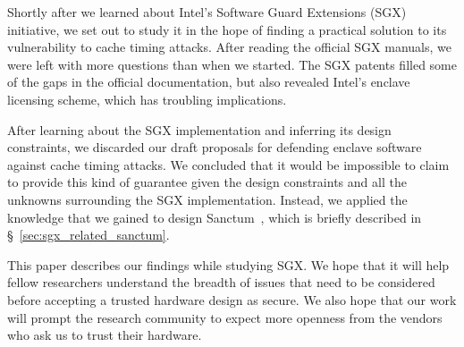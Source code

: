 
Shortly after we learned about Intel's Software Guard Extensions
(SGX) initiative, we set out to study it in the hope of finding a practical
solution to its vulnerability to cache timing attacks. After reading the
official SGX manuals, we were left with more questions than when we started.
The SGX patents filled some of the gaps in the official documentation, but also
revealed Intel's enclave licensing scheme, which has troubling implications.

After learning about the SGX implementation and inferring its design
constraints, we discarded our draft proposals for defending enclave software
against cache timing attacks. We concluded that it would be impossible to claim
to provide this kind of guarantee given the design constraints and all the
unknowns surrounding the SGX implementation. Instead, we applied the knowledge
that we gained to design Sanctum~\cite{costan2015sanctum}, which is briefly
described in \S~\ref{sec:sgx_related_sanctum}.

This paper describes our findings while studying SGX. We hope that it will help
fellow researchers understand the breadth of issues that need to be considered
before accepting a trusted hardware design as secure. We also hope that our
work will prompt the research community to expect more openness from the
vendors who ask us to trust their hardware.
